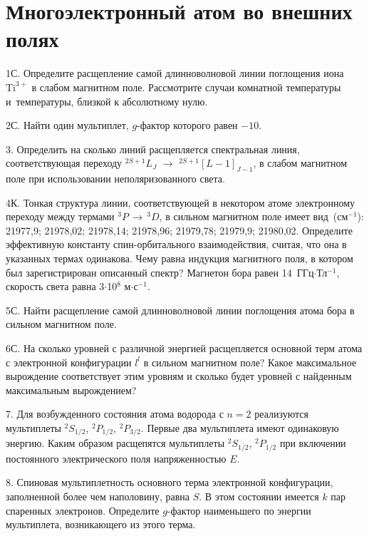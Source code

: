 \setmainfont{Noto Serif}
\setsansfont{Noto Sans}
\setmonofont{Noto Sans Mono}


\section{Многоэлектронный атом во внешних полях}

1С. Определите расщепление самой длинноволновой линии поглощения иона $\text{Ti}^{3+}$ в слабом магнитном поле. Рассмотрите случаи комнатной температуры и~температуры, близкой к абсолютному нулю.
\par
2С. Найти один мультиплет, $g$-фактор которого равен $-10$.
\par
3. Определить на сколько линий расщепляется спектральная линия, соответствующая переходу $^{2S+1}L_J$ $\rightarrow$ $^{2S+1}[L-1]_{J-1}$, в слабом магнитном поле при использовании неполяризованного света.
\par
4К. Тонкая структура линии, соответствующей в некотором атоме электронному переходу между термами $^3P \,\rightarrow\,^3D$, в сильном магнитном поле имеет вид~(см$^{-1}$): 21977,9; 21978,02; 21978,14; 21978,96; 21979,78; 21979,9; 21980,02. Определите эффективную константу спин-орбитального взаимодействия, считая, что она в указанных термах одинакова. Чему равна индукция магнитного поля, в котором был зарегистрирован описанный спектр? Магнетон бора равен 14~ГГц$\cdot$Тл$^{-1}$, скорость света равна 3$\cdot$10$^8$ м$\cdot$с$^{-1}$.
\par
5С. Найти расщепление самой длинноволновой линии поглощения атома бора в сильном магнитном поле.
\par
6С. На сколько уровней с различной энергией расщепляется основной терм атома с электронной конфигурации $l^l$ в сильном магнитном поле? Какое максимальное вырождение соответствует этим уровням и сколько будет уровней с найденным максимальным вырождением?
\par
7. Для возбужденного состояния атома водорода с $n = 2$ реализуются мультиплеты $^2S_{1/2}$, $^2P_{1/2}$, $^2P_{3/2}$. Первые два мультиплета имеют одинаковую энергию. Каким образом расщепятся мультиплеты $^2S_{1/2}$, $^2P_{1/2}$ при включении постоянного электрического поля напряженностью $E$.
\par
8. Спиновая мультиплетность основного терма электронной конфигурации, заполненной более чем наполовину, равна $S$. В этом состоянии имеется $k$ пар спаренных электронов. Определите $g$-фактор наименьшего по энергии мультиплета, возникающего из этого терма.
